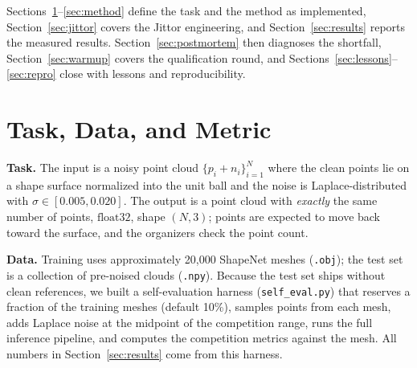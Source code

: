 \documentclass{article}
\begin{document}
Sections~\ref{sec:task}--\ref{sec:method} define the task and the method as implemented, Section~\ref{sec:jittor} covers the Jittor engineering, and Section~\ref{sec:results} reports the measured results. Section~\ref{sec:postmortem} then diagnoses the shortfall, Section~\ref{sec:warmup} covers the qualification round, and Sections~\ref{sec:lessons}--\ref{sec:repro} close with lessons and reproducibility.

\section{Task, Data, and Metric}
\label{sec:task}

\textbf{Task.} The input is a noisy point cloud $\{p_i + n_i\}_{i=1}^{N}$ where the clean points lie on a shape surface normalized into the unit ball and the noise is Laplace-distributed with $\sigma \in [0.005, 0.020]$. The output is a point cloud with \emph{exactly} the same number of points, $\text{float32}$, shape $(N, 3)$; points are expected to move back toward the surface, and the organizers check the point count.

\textbf{Data.} Training uses approximately 20{,}000 ShapeNet meshes (\texttt{.obj}); the test set is a collection of pre-noised clouds (\texttt{.npy}). Because the test set ships without clean references, we built a self-evaluation harness (\texttt{self\_eval.py}) that reserves a fraction of the training meshes (default 10\%), samples points from each mesh, adds Laplace noise at the midpoint of the competition range, runs the full inference pipeline, and computes the competition metrics against the mesh. All numbers in Section~\ref{sec:results} come from this harness.
\end{document}
